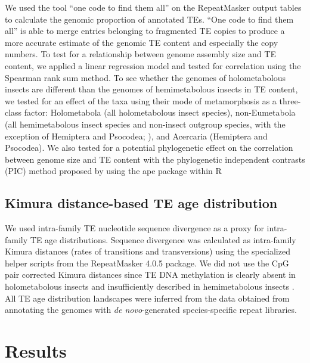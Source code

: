 We used the tool ``one code to find them all'' \citep{Bailly-Bechet2014}
on the RepeatMasker output tables to calculate the genomic proportion of
annotated TEs. ``One code to find them all'' is able to merge entries
belonging to fragmented TE copies to produce a more accurate estimate of
the genomic TE content and especially the copy numbers. To test for a
relationship between genome assembly size and TE content, we applied a
linear regression model and tested for correlation using the Spearman
rank sum method. To see whether the genomes of holometabolous insects
are different than the genomes of hemimetabolous insects in TE content,
we tested for an effect of the taxa using their mode of metamorphosis as
a three-class factor: Holometabola (all holometabolous insect species),
non-Eumetabola (all hemimetabolous insect species and non-insect
outgroup species, with the exception of Hemiptera and Psocodea;
\citet{Beutel2013}), and Acercaria (Hemiptera and Psocodea). We also
tested for a potential phylogenetic effect on the correlation between
genome size and TE content with the phylogenetic independent contrasts
(PIC) method proposed by \citet{Felsenstein1985} using the ape package
\citep{Paradis2004} within R \citep{RCoreTeam2017}





\subsection{Kimura distance-based TE age
distribution}\label{kimura-distance-based-te-age-distribution}

We used intra-family TE nucleotide sequence divergence as a proxy for
intra-family TE age distributions. Sequence divergence was calculated as
intra-family Kimura distances (rates of transitions and transversions)
using the specialized helper scripts from the RepeatMasker 4.0.5
package. We did not use the CpG pair corrected Kimura distances since TE
DNA methylation is clearly absent in holometabolous insects and
insufficiently described in hemimetabolous insects \citep{Glastad2014}.
All TE age distribution landscapes were inferred from the data obtained
from annotating the genomes with \emph{de novo}-generated
species-specific repeat libraries.

\section{Results}\label{results}

